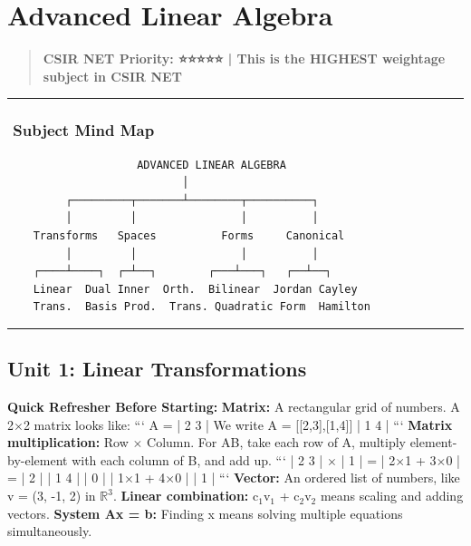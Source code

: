 \documentclass[12pt,a4paper,openany]{book}
\begin{document}
{{\chapter{Advanced Linear Algebra}


\begin{quote}
\textbf{CSIR NET Priority: ⭐⭐⭐⭐⭐ | This is the HIGHEST weightage subject in CSIR NET}
\end{quote}

\bigskip\noindent\rule{\textwidth}{0.4pt}\bigskip

\subsection{️ Subject Mind Map}

\begin{verbatim}
                    ADVANCED LINEAR ALGEBRA
                           │
         ┌─────────┬───────┴────────┬──────────┐
         │         │                │          │
    Transforms   Spaces          Forms     Canonical
         │         │                │          │
    ┌────┴────┐  ┌─┴──┐        ┌───┴───┐   ┌──┴──┐
    Linear  Dual Inner  Orth.  Bilinear  Jordan Cayley
    Trans.  Basis Prod.  Trans. Quadratic Form  Hamilton
\end{verbatim}

\bigskip\noindent\rule{\textwidth}{0.4pt}\bigskip

\section{Unit 1: Linear Transformations}

\begin{prereqbox}
 \textbf{Quick Refresher Before Starting:}
\textbf{Matrix:} A rectangular grid of numbers. A 2$\times$2 matrix looks like:
```
A = | 2  3 |    We write A = [[2,3],[1,4]]
| 1  4 |
```
\textbf{Matrix multiplication:} Row $\times$ Column. For AB, take each row of A, multiply element-by-element with each column of B, and add up.
```
| 2 3 | $\times$ | 1 | = | 2$\times$1 + 3$\times$0 | = | 2 |
| 1 4 |   | 0 |   | 1$\times$1 + 4$\times$0 |   | 1 |
```
\textbf{Vector:} An ordered list of numbers, like v = (3, -1, 2) in $\mathbb{R}^3$.
\textbf{Linear combination:} c$_1$v$_1$ + c$_2$v$_2$ means scaling and adding vectors.
\textbf{System Ax = b:} Finding x means solving multiple equations simultaneously.
\end{prereqbox}



}}
\end{document}

